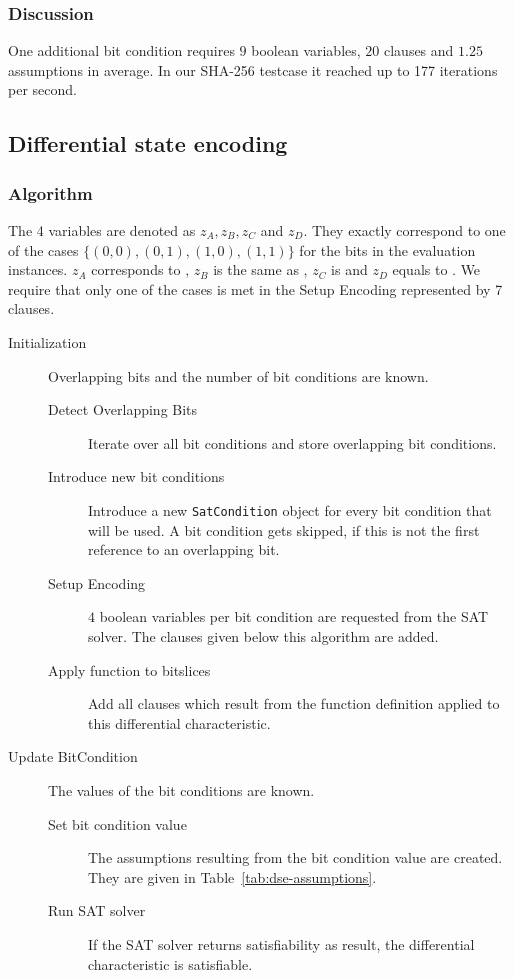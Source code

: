\subsubsection{Discussion}
\label{sec:reduced-encoding-discussion}
%
One additional bit condition requires $9$ boolean variables, $20$ clauses and $1.25$ assumptions in average.
In our SHA-256 testcase it reached up to 177 iterations per second.

\subsection{Differential state encoding}
\label{sec:encoding:dse}
%
\subsubsection{Algorithm}
\label{sec:encoding:dse-algorithm}
%
The 4 variables are denoted as $z_A, z_B, z_C$ and $z_D$. They exactly correspond to one of the cases $\{(0, 0), (0, 1), (1, 0), (1, 1)\}$ for the bits in the evaluation instances. $z_A$ corresponds to , $z_B$ is the same as , $z_C$ is  and $z_D$ equals to . We require that only one of the cases is met in the Setup Encoding represented by 7 clauses.
%
\begin{description}
  \item[Initialization] Overlapping bits and the number of bit conditions are known.
    \begin{description}
      \item[Detect Overlapping Bits] Iterate over all bit conditions and store overlapping bit conditions.
      \item[Introduce new bit conditions] Introduce a new \texttt{SatCondition} object for every bit condition that will be used. A bit condition gets skipped, if this is not the first reference to an overlapping bit.
      \item[Setup Encoding] $4$ boolean variables per bit condition are requested from the SAT solver. The clauses given below this algorithm are added.
      \item[Apply function to bitslices] Add all clauses which result from the function definition applied to this differential characteristic.
    \end{description}
  \item[Update BitCondition] The values of the bit conditions are known.
    \begin{description}
      \item[Set bit condition value] The assumptions resulting from the bit condition value are created. They are given in Table~\ref{tab:dse-assumptions}.
      \item[Run SAT solver] If the SAT solver returns satisfiability as result, the differential characteristic is satisfiable.
    \end{description}
\end{description}

